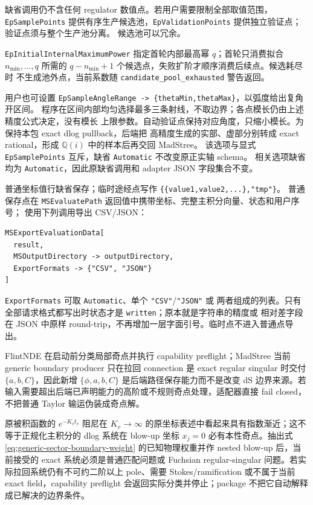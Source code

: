 \documentclass[11pt,a4paper]{ctexart}
\begin{document}
缺省调用仍不含任何 regulator 数值点。若用户需要限制全部取值范围，
\texttt{EpSamplePoints} 提供有序生产候选池，\texttt{EpValidationPoints} 提供独立验证点；
验证点须与整个生产池分离。
候选池可以冗余。

\texttt{EpInitialInternalMaximumPower} 指定首轮内部最高幂 $q$；首轮只消费拟合
$n_{\min},\ldots,q$ 所需的 $q-n_{\min}+1$ 个候选点，失败扩阶才顺序消费后续点。候选耗尽时
不生成池外点，当前系数随 \texttt{candidate\_pool\_exhausted} 警告返回。

用户也可设置 \texttt{EpSampleAngleRange -> \{thetaMin,thetaMax\}}，以弧度给出复角开区间。
程序在区间内部均匀选择最多三条射线，不取边界；各点模长仍由上述精度公式决定，没有模长
上限参数。自动验证点保持对应角度，只缩小模长。为保持本包 exact dlog pullback，后端把
高精度生成的实部、虚部分别转成 exact rational，形成 $\mathbb Q(i)$ 中的样本后再交回 MadStree。
该选项与显式 \texttt{EpSamplePoints} 互斥，缺省 \texttt{Automatic} 不改变原正实轴 schema。
相关选项缺省均为 \texttt{Automatic}，因此原缺省调用和 adapter JSON 字段集合不变。

普通坐标值行缺省保存；临时途经点写作
\texttt{\{\{value1,value2,...\},}\allowbreak\texttt{"tmp"\}}。
普通保存点在 \texttt{MSEvaluatePath} 返回值中携带坐标、完整主积分向量、状态和用户序号；
使用下列调用导出 CSV/JSON：
\begin{verbatim}
MSExportEvaluationData[
  result,
  MSOutputDirectory -> outputDirectory,
  ExportFormats -> {"CSV", "JSON"}
]
\end{verbatim}
\texttt{ExportFormats} 可取 \texttt{Automatic}、单个 \texttt{"CSV"}/\texttt{"JSON"} 或
两者组成的列表。只有全部请求格式都写出时状态才是 \texttt{written}；原本就是字符串的精度或
相对差字段在 JSON 中原样 round-trip，不再增加一层字面引号。临时点不进入普通点导出。

FlintNDE 在启动前分类局部奇点并执行 capability preflight；MadStree 当前 generic boundary producer 只在拉回 connection 是 exact regular singular 时交付 $\{a,b,C\}$，因此新增 $\{\phi,a,b,C\}$ 是后端路径保存能力而不是改变 dS 边界来源。若输入需要超出后端已声明能力的高阶或不规则奇点处理，适配器直接 fail closed，不把普通 Taylor 输运伪装成奇点解。

原被积函数的 $e^{-K_vt_v}$ 阻尼在 $K_v\to\infty$ 的原坐标表述中看起来具有指数渐近；这不等于正规化主积分的 dlog 系统在 blow-up 坐标 $x_j=0$ 必有本性奇点。抽出式 \eqref{eq:generic-sector-boundary-weight} 的已知物理权重并作 nested blow-up 后，当前接受的 exact 系统必须是普通匹配问题或 Fuchsian regular-singular 问题。若实际拉回系统仍有不可约二阶以上 pole、需要 Stokes/ramification 或不属于当前 exact field，capability preflight 会返回实际分类并停止；package 不把它自动解释成已解决的边界条件。
\end{document}
